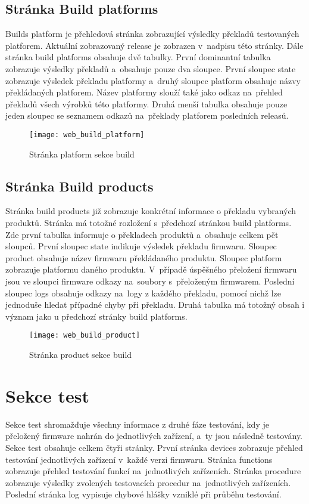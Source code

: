 \subsection{Stránka Build platforms}
Builds platform je přehledová stránka zobrazující výsledky překladů testovaných platforem. Aktuální zobrazovaný release je zobrazen v~nadpisu této stránky. Dále stránka build platforms obsahuje dvě tabulky. První dominantní tabulka zobrazuje výsledky překladů a~obsahuje pouze dva sloupce. První sloupec state zobrazuje výsledek překladu platformy a~druhý sloupec platform obsahuje názvy překládaných platforem. Název platformy slouží také jako odkaz na~přehled překladů všech výrobků této platformy. Druhá menší tabulka obsahuje pouze jeden sloupec se seznamem odkazů na~překlady platforem posledních releasů.

\begin{figure}[h]
  \centering
  \texttt{[image: web\_build\_platform]}
  \caption{Stránka platform sekce build}
  \label{fig:web_build_platform}
\end{figure}

\subsection{Stránka Build products}
Stránka build products již zobrazuje konkrétní informace o překladu vybraných produktů. Stránka má totožné rozložení s~předchozí stránkou build platforms. Zde první tabulka informuje o překladech produktů a~obsahuje celkem pět sloupců. První sloupec state indikuje výsledek překladu firmwaru. Sloupec product obsahuje název firmwaru překládaného produktu. Sloupec platform zobrazuje platformu daného produktu. V~případě úspěšného přeložení firmwaru jsou ve sloupci firmware odkazy na~soubory s~přeloženým firmwarem. Poslední sloupec logs obsahuje odkazy na~logy z každého překladu, pomocí nichž lze jednoduše hledat případné chyby při překladu. Druhá tabulka má totožný obsah i význam jako u předchozí stránky build platforms.

\begin{figure}[h]
  \centering
  \texttt{[image: web\_build\_product]}
  \caption{Stránka product sekce build}
  \label{fig:web_build_platform}
\end{figure}

\section{Sekce test}
Sekce test shromažďuje všechny informace z druhé fáze testování, kdy je přeložený firmware nahrán do jednotlivých zařízení, a~ty jsou následně testovány. Sekce test obsahuje celkem čtyři stránky. První stránka devices zobrazuje přehled testování jednotlivých zařízení v~každé verzi firmwaru. Stránka functions zobrazuje přehled testování funkcí na~jednotlivých zařízeních. Stránka procedure zobrazuje výsledky zvolených testovacích procedur na~jednotlivých zařízeních. Poslední stránka log vypisuje chybové hlášky vzniklé při průběhu testování.

